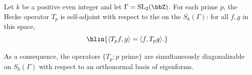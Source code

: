 \begin{proposition} \label{proposition:hecke_operators_are_self_adjoint_wrt_petersson_inner_product}
Let $k$ be a positive even integer and let $\Gamma = \mathrm{SL}_2(\bbZ)$. For each prime $p$, the Hecke operator $T_p$ is self-adjoint with respect to the  on the  $S_k(\Gamma)$: for all $f, g$ in this space,
$$\hlin{\langle T_p f, g \rangle = \langle f, T_p g \rangle.}$$

As a consequence, the operators $\{T_p : p \text{ prime}\}$ are simultaneously diagonalizable on $S_k(\Gamma)$ with respect to an orthonormal basis of eigenforms.
\end{proposition}


